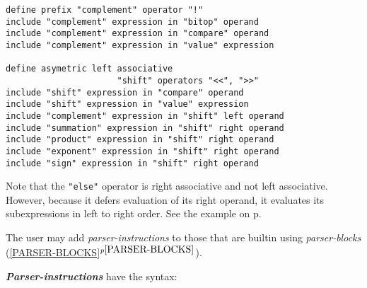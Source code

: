 \documentclass[12pt]{article}
\newcommand{\ikey}[2]{{\bf \em #1}\index{#2}}
\newcommand{\itemref}[1]{\ref{#1}$^{p\pageref{#1}}$}
\newcommand{\pagref}[1]{p\pageref{#1}}
\newenvironment{indpar}[1][0.3in]%
	{\begin{list}{}%
		     {\setlength{\itemsep}{0in}%
		      \setlength{\topsep}{0in}%
		      \setlength{\parsep}{1ex}%
		      \setlength{\labelwidth}{#1}%
		      \setlength{\leftmargin}{#1}%
		      \addtolength{\leftmargin}{\labelsep}}%
	 \item}%
	{\end{list}}
\begin{document}
\begin{indpar}
\begin{verbatim}
define prefix "complement" operator "!"
include "complement" expression in "bitop" operand
include "complement" expression in "compare" operand
include "complement" expression in "value" expression

define asymetric left associative
                      "shift" operators "<<", ">>"
include "shift" expression in "compare" operand
include "shift" expression in "value" expression
include "complement" expression in "shift" left operand
include "summation" expression in "shift" right operand
include "product" expression in "shift" right operand
include "exponent" expression in "shift" right operand
include "sign" expression in "shift" right operand

\end{verbatim}\end{indpar}

Note that the {\tt "else"} operator is right associative and not
left associative.  However, because it defers evaluation of its
right operand, it evaluates its subexpressions in left to
right order.  See the example on \pagref{IF-ELSE-EXAMPLE}.

The user may add {\em parser-instructions} to those that
are builtin using {\em parser-blocks} (\itemref{PARSER-BLOCKS}).

\ikey{Parser-instructions}{parser-instruction}\label{PARSER-INSTRUCTION}
have the syntax:
\end{document}
